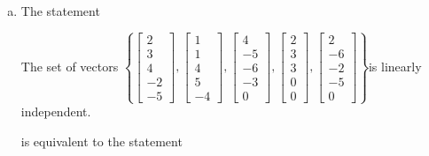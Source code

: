 \begin{exerciseAnswer}
\begin{enumerate}[(a)]
\item The statement 
\begin{center}\begin{minipage}{0.8\textwidth}
 The set of vectors \( \left\{ \left[\begin{array}{c}
2 \\
3 \\
4 \\
-2 \\
-5
\end{array}\right] , \left[\begin{array}{c}
1 \\
1 \\
4 \\
5 \\
-4
\end{array}\right] , \left[\begin{array}{c}
4 \\
-5 \\
-6 \\
-3 \\
0
\end{array}\right] , \left[\begin{array}{c}
2 \\
3 \\
3 \\
0 \\
0
\end{array}\right] , \left[\begin{array}{c}
2 \\
-6 \\
-2 \\
-5 \\
0
\end{array}\right] \right\} \)is linearly independent.
\end{minipage}\end{center}
     is equivalent to the statement 
\begin{center}\begin{minipage}{0.8\textwidth}
 The vector equation \( x_{1} \left[\begin{array}{c}
2 \\
3 \\
4 \\
-2 \\
-5
\end{array}\right] + x_{2} \left[\begin{array}{c}
1 \\
1 \\

\end{array}
\end{minipage}
\end{center}
\end{enumerate}
\end{exerciseAnswer}
